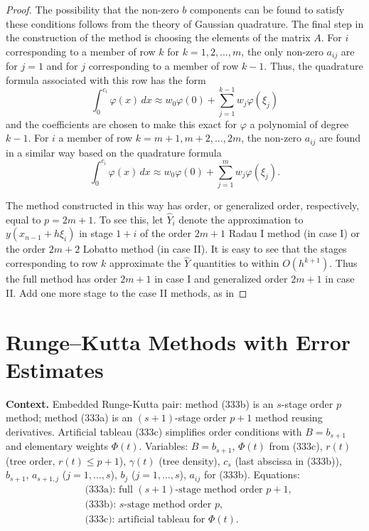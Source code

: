 \begin{proof}
The possibility that the non-zero $b$ components can be found to satisfy these conditions follows from the theory of Gaussian quadrature. The final step in the construction of the method is choosing the elements of the matrix $A$. For $i$ corresponding to a member of row $k$ for $k = 1, 2, \dots, m$, the only non-zero $a_{ij}$ are for $j = 1$ and for $j$ corresponding to a member of row $k - 1$. Thus, the quadrature formula associated with this row has the form
\[
\int_0^{c_i} \varphi(x) \, dx \approx w_0 \varphi(0) + \sum_{j=1}^{k-1} w_j \varphi(\xi_j)
\]
and the coefficients are chosen to make this exact for $\varphi$ a polynomial of degree $k - 1$. For $i$ a member of row $k = m + 1, m + 2, \dots, 2m$, the non-zero $a_{ij}$ are found in a similar way based on the quadrature formula
\[
\int_0^{c_i} \varphi(x) \, dx \approx w_0 \varphi(0) + \sum_{j=1}^m w_j \varphi(\xi_j).
\]

The method constructed in this way has order, or generalized order, respectively, equal to $p = 2m + 1$. To see this, let $\widehat{Y}_i$ denote the approximation to $y(x_{n-1} + h\xi_i)$ in stage $1 + i$ of the order $2m + 1$ Radau I method (in case I) or the order $2m + 2$ Lobatto method (in case II). It is easy to see that the stages corresponding to row $k$ approximate the $\widehat{Y}$ quantities to within $O(h^{k+1})$. Thus the full method has order $2m + 1$ in case I and generalized order $2m + 1$ in case II. Add one more stage to the case II methods, as in
\end{proof}

\section{Runge–Kutta Methods with Error Estimates}

\noindent\textbf{Context.}
Embedded Runge-Kutta pair: method (333b) is an $s$-stage order $p$ method; method (333a) is an $(s+1)$-stage order $p+1$ method reusing derivatives. Artificial tableau (333c) simplifies order conditions with $B = b_{s+1}$ and elementary weights $\Phi(t)$. Variables: $B = b_{s+1}$, $\Phi(t)$ from (333c), $r(t)$ (tree order, $r(t) \le p+1$), $\gamma(t)$ (tree density), $c_s$ (last abscissa in (333b)), $b_{s+1}$, $a_{s+1,j}$ ($j=1,\dots,s$), $b_j$ ($j=1,\dots,s$), $a_{ij}$ for (333b). Equations:
\begin{align}
&\text{(333a): full }(s+1)\text{-stage method order }p+1,\\
&\text{(333b): }s\text{-stage method order }p,\\
&\text{(333c): artificial tableau for }\Phi(t).
\end{align}

